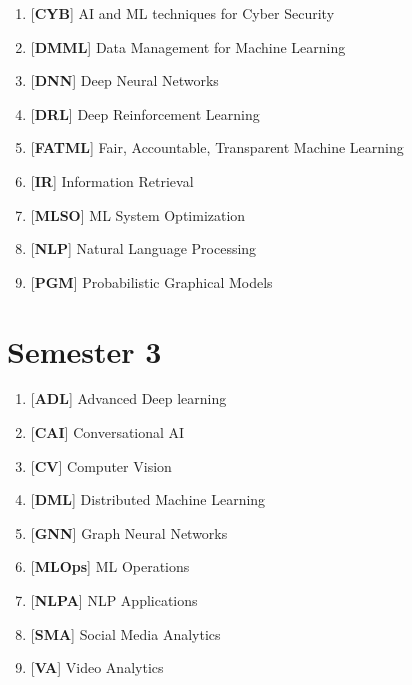 \begin{enumerate}[resume*=sublist]
    \item {[\textbf{CYB}]} AI and ML techniques for Cyber Security
    \item {[\textbf{DMML}]} Data Management for Machine Learning
    \item {[\textbf{DNN}]} Deep Neural Networks
    \item {[\textbf{DRL}]} Deep Reinforcement Learning
    \item {[\textbf{FATML}]} Fair, Accountable, Transparent Machine Learning
    \item {[\textbf{IR}]} Information Retrieval
    \item {[\textbf{MLSO}]} ML System Optimization
    \item {[\textbf{NLP}]} Natural Language Processing
    \item {[\textbf{PGM}]} Probabilistic Graphical Models
\end{enumerate}


\section*{Semester 3}

\begin{enumerate}[resume*=sublist]
    \item {[\textbf{ADL}]} Advanced Deep learning
    \item {[\textbf{CAI}]} Conversational AI
    \item {[\textbf{CV}]} Computer Vision
    \item {[\textbf{DML}]} Distributed Machine Learning
    \item {[\textbf{GNN}]} Graph Neural Networks
    \item {[\textbf{MLOps}]} ML Operations
    \item {[\textbf{NLPA}]} NLP Applications
    \item {[\textbf{SMA}]} Social Media Analytics
    \item {[\textbf{VA}]} Video Analytics
\end{enumerate}







